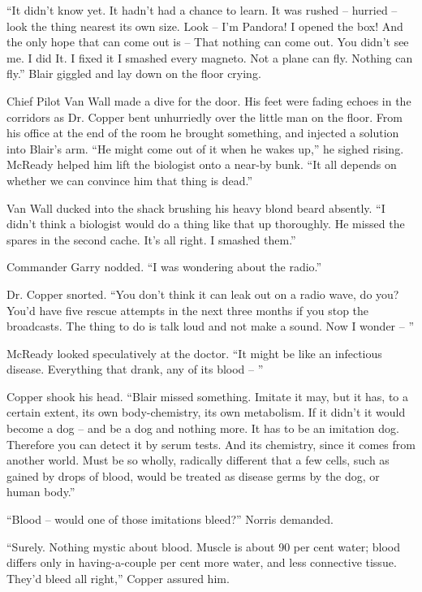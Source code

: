 \documentclass[letterpaper,openany,12pt]{memoir}		%
\begin{document}
``It didn't know yet. It hadn't had a chance to learn. It was rushed -- hurried
-- look the thing nearest its own size. Look -- I'm Pandora! I opened the box!
And the only hope that can come out is -- That nothing can come out. You didn't
see me. I did It. I fixed it I smashed every magneto. Not a plane can fly.
Nothing can fly.'' Blair giggled and lay down on the floor crying.

Chief Pilot Van Wall made a dive for the door. His feet were fading echoes in
the corridors as Dr. Copper bent unhurriedly over the little man on the floor.
From his office at the end of the room he brought something, and injected a
solution into Blair's arm. ``He might come out of it when he wakes up,'' he
sighed rising. McReady helped him lift the biologist onto a near-by bunk. ``It
all depends on whether we can convince him that thing is dead.''

Van Wall ducked into the shack brushing his heavy blond beard absently. ``I
didn't think a biologist would do a thing like that up thoroughly. He missed the
spares in the second cache. It's all right. I smashed them.''

Commander Garry nodded. ``I was wondering about the radio.''

Dr. Copper snorted. ``You don't think it can leak out on a radio wave, do you?
You'd have five rescue attempts in the next three months if you stop the
broadcasts. The thing to do is talk loud and not make a sound. Now I wonder --
''

McReady looked speculatively at the doctor. ``It might be like an infectious
disease. Everything that drank, any of its blood -- ''

Copper shook his head. ``Blair missed something. Imitate it may, but it has, to
a certain extent, its own body-chemistry, its own metabolism. If it didn't it
would become a dog -- and be a dog and nothing more. It has to be an imitation
dog. Therefore you can detect it by serum tests. And its chemistry, since it
comes from another world. Must be so wholly, radically different that a few
cells, such as gained by drops of blood, would be treated as disease germs by
the dog, or human body.''

``Blood -- would one of those imitations bleed?'' Norris demanded.

``Surely. Nothing mystic about blood. Muscle is about 90 per cent water; blood
differs only in having-a-couple per cent more water, and less connective tissue.
They'd bleed all right,'' Copper assured him.
\end{document}
